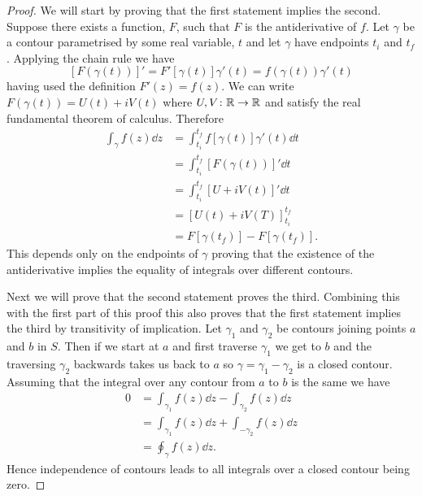 \documentclass{article}
\begin{document}
    \begin{proof}
        We will start by proving that the first statement implies the second.
        Suppose there exists a function, \(F\), such that \(F\) is the antiderivative of \(f\).
        Let \(\gamma\) be a contour parametrised by some real variable, \(t\) and let \(\gamma\) have endpoints \(t_i\) and \(t_f\).
        Applying the chain rule we have
        \[[F(\gamma(t))]' = F'[\gamma(t)]\gamma'(t) = f(\gamma(t))\gamma'(t)\]
        having used the definition \(F'(z) = f(z)\).
        We can write \(F(\gamma(t)) = U(t) + iV(t)\) where \(U, V\colon\mathbb{R}\to\mathbb{R}\) and satisfy the real fundamental theorem of calculus.
        Therefore
        \begin{align*}
            \int_\gamma f(z) \dd{z} &= \int_{t_i}^{t_f} f[\gamma(t)]\gamma'(t)\dd{t}\\
            &= \int_{t_i}^{t_f} [F(\gamma(t))]'\dd{t}\\
            &= \int_{t_i}^{t_f} [U + iV(t)]'\dd{t}\\
            &= [U(t) + iV(T)]_{t_i}^{t_f}\\
            &= F[\gamma(t_f)] - F[\gamma(t_f)].
        \end{align*}
        This depends only on the endpoints of \(\gamma\) proving that the existence of the antiderivative implies the equality of integrals over different contours.
        
        Next we will prove that the second statement proves the third.
        Combining this with the first part of this proof this also proves that the first statement implies the third by transitivity of implication.
        Let \(\gamma_1\) and \(\gamma_2\) be contours joining points \(a\) and \(b\) in \(S\).
        Then if we start at \(a\) and first traverse \(\gamma_1\) we get to \(b\) and the traversing \(\gamma_2\) backwards takes us back to \(a\) so \(\gamma = \gamma_1 - \gamma_2\) is a closed contour.
        Assuming that the integral over any contour from \(a\) to \(b\) is the same we have
        \begin{align*}
            0 &= \int_{\gamma_1} f(z)\dd{z} - \int_{\gamma_2} f(z)\dd{z}\\
            &= \int_{\gamma_1} f(z) \dd{z} + \int_{-\gamma_2} f(z)\dd{z}\\
            &= \oint_{\gamma} f(z) \dd{z}.
        \end{align*}
        Hence independence of contours leads to all integrals over a closed contour being zero.
        

\end{proof}
\end{document}
